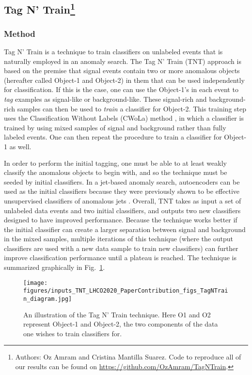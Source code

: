 \documentclass[a4paper,11pt]{article}
\begin{document}
 \FloatBarrier
\subsection[Tag N' Train]{Tag N' Train\footnote{Authors: Oz Amram and Cristina Mantilla Suarez.  Code to reproduce all of our results can be found on \href{https://github.com/OzAmram/TagNTrain}{https://github.com/OzAmram/TagNTrain}.}}
\label{sec:tnt}
\subsubsection{Method}


\noindent 
Tag N' Train \cite{Amram:2020ykb} is a technique to train classifiers on unlabeled events that is naturally employed in an anomaly search.
The Tag N' Train (TNT) approach  is based on the premise that signal events contain two or more anomalous objects (hereafter called Object-1 and Object-2)
in them that can be used independently for classification.
If this is the case, one can use the Object-1's in each event to \textit{tag} examples as signal-like or background-like. 
These signal-rich and background-rich samples can then be used to \textit{train} a classifier for Object-2. 
This training step uses the Classification Without Labels (CWoLa) method \cite{Metodiev:2017vrx}, in which a classifier is trained by using mixed samples of signal and background rather than fully labeled events.
One can then repeat the procedure to train a classifier for Object-1 as well. 

In order to perform the initial tagging, one must be able to at least weakly classify the anomalous objects to begin with, and so the technique must be seeded by initial classifiers.
In a jet-based anomaly search, autoencoders can be used as the initial classifiers because 
they were previously shown to be effective unsupervised classifiers of anomalous jets \cite{Farina:2018fyg,Heimel:2018mkt} . 
Overall, TNT takes as input a set of unlabeled data events and two initial classifiers, and outputs two new classifiers designed to have improved performance.
Because the technique works better if the initial classifier can create a larger separation between signal and background in the mixed samples, multiple iterations of this technique (where the output classifiers are used with a new data sample to train new classifiers) can further improve classification performance until a plateau is reached.
The technique is summarized graphically in Fig.~\ref{fig:TNT_algo}.

\begin{figure}[h!]
\centering
\texttt{[image: figures/inputs\_TNT\_LHCO2020\_PaperContribution\_figs\_TagNTrain\_diagram.jpg]}
\caption{An illustration of the Tag N’ Train technique. Here O1 and O2 represent Object-1 and
Object-2, the two components of the data one wishes to train classifiers for.}
\label{fig:TNT_algo}
\end{figure}
\end{document}
